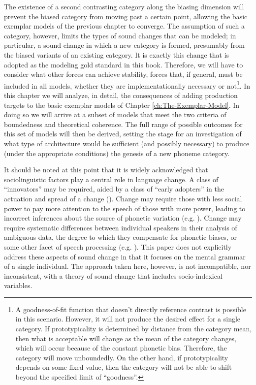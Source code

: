 The existence of a second contrasting category along the biasing dimension
will prevent the biased category from moving past a certain point,
allowing the basic exemplar models of the previous chapter to converge.
The assumption of such a category, however, limits the types of sound
changes that can be modeled; in particular, a sound change in which
a new category is formed, presumably from the biased variants of an
existing category. It is exactly this change that is adopted as the
modeling gold standard in this book. Therefore, we will have to consider
what other forces can achieve stability, forces that, if general,
must be included in all models, whether they are implementationally
necessary or not\footnote{A goodness-of-fit function that doesn't directly reference contrast
is possible in this scenario. However, it will not produce the desired
effect for a single category. If prototypicality is determined by
distance from the category mean, then what is acceptable will change
as the mean of the category changes, which will occur because of the
constant phonetic bias. Therefore, the category will move unboundedly.
On the other hand, if prototypicality depends on some fixed value,
then the category will not be able to shift beyond the specified limit
of ``goodness''. }. In this chapter we will analyze, in detail, the consequences of
adding production targets to the basic exemplar models of Chapter
\ref{ch:The-Exemplar-Model}. In doing so we will arrive at a subset
of models that meet the two criteria of boundedness and theoretical
coherence. The full range of possible outcomes for this set of models
will then be derived, setting the stage for an investigation of what
type of architecture would be sufficient (and possibly necessary)
to produce (under the appropriate conditions) the genesis of a new
phoneme category.

It should be noted at this point that it is widely acknowledged that
sociolinguistic factors play a central role in language change. A
class of ``innovators'' may be required, aided by a class of ``early
adopters'' in the actuation and spread of a change (\citealt{milroy1985linguistic}).
Change may require those with less social power to pay more attention
to the speech of those with more power, leading to incorrect inferences
about the source of phonetic variation (e.g. \citealt{Garrett2013}).
Change may require systematic differences between individual speakers
in their analysis of ambiguous data, the degree to which they compensate
for phonetic biases, or some other facet of speech processing (e.g.
\citealp{Beddor2009,yu2013socio}). This paper does not explicitly
address these aspects of sound change in that it focuses on the mental
grammar of a single individual. The approach taken here, however,
is not incompatible, nor inconsistent, with a theory of sound change
that includes socio-indexical variables.

